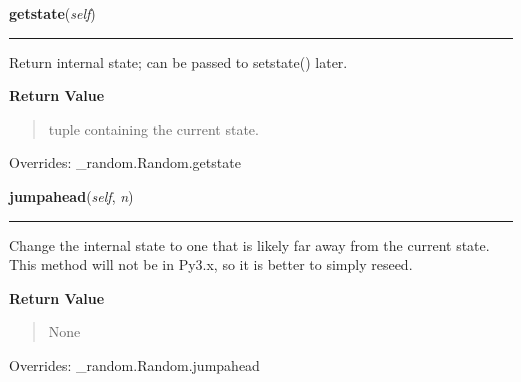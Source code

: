 \hspace{.8\funcindent}\begin{boxedminipage}{\funcwidth}

    \raggedright \textbf{getstate}(\textit{self})

    \vspace{-1.5ex}

    \rule{\textwidth}{0.5\fboxrule}
\setlength{\parskip}{2ex}
    Return internal state; can be passed to setstate() later.

\setlength{\parskip}{1ex}
      \textbf{Return Value}
    \vspace{-1ex}

      \begin{quote}
      tuple containing the current state.

      \end{quote}

      Overrides: \_random.Random.getstate

    \end{boxedminipage}

    \vspace{0.5ex}

\hspace{.8\funcindent}\begin{boxedminipage}{\funcwidth}

    \raggedright \textbf{jumpahead}(\textit{self}, \textit{n})

    \vspace{-1.5ex}

    \rule{\textwidth}{0.5\fboxrule}
\setlength{\parskip}{2ex}
    Change the internal state to one that is likely far away from the 
    current state.  This method will not be in Py3.x, so it is better to 
    simply reseed.

\setlength{\parskip}{1ex}
      \textbf{Return Value}
    \vspace{-1ex}

      \begin{quote}
      None

      \end{quote}

      Overrides: \_random.Random.jumpahead

    \end{boxedminipage}

    \label{random:Random:lognormvariate}

    \vspace{0.5ex}

